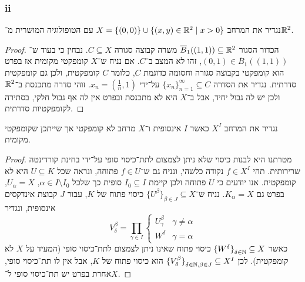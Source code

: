 \subsubsection{ii}
נגדיר את המרחב $X = \{ (0, 0) \} \cup \{ (x, y) \in \mathbb{R}^2 \mid x > 0 \}$ עם הטופולוגיה המושרית מ־$\mathbb{R}^2$.
\begin{proof}
	הכדור הסגור $\overline{B}_1((1, 1)) \subseteq \mathbb{R}^2$ משרה קבוצה סגורה $C \subseteq X$.
	נבחין כי בעוד ש־$(0, 1) \in \overline{B}_1((1, 1))$, זהו לא המצב ב־$C$.
	אם נניח ש־$X$ קומפקטי מקומית אז בפרט הוא קומפקטי בקבוצה סגורה וחסומה כדוגמת $C$, כלומר $C$ קומפקטית, ולכן גם קומפקטית סדרתית.
	נגדיר את הסדרה ${\{ x_n \}}_{n = 1}^\infty \subseteq C$ על־ידי $x_n = (\frac{1}{n}, 1)$.
	זוהי סדרה מתכנסת ב־$\mathbb{R}^2$ ולכן יש לה גבול יחיד, אבל ב־$X$ היא לא מתכנסת ובפרט אין לה אף גבול חלקי, בסתירה לקומפקטיות סדרתית.
\end{proof}

\subquestion{}
נגדיר את המרחב $X^I$ כאשר $I$ אינסופית ו־$X$ מרחב לא קומפקטי אך שייתכן שקומפקטי מקומית.
\begin{proof}
	מטרתנו היא לבנות כיסוי שלא ניתן לצמצום לתת־כיסוי סופי על־ידי בחינת קורדינטה שרירותית.
	תהי $f \in X^I$ נקודה כלשהי, ונניח גם ש־$f \in U$ פתוחה, ונראה שכל $U \subseteq K$ היא לא קומפקטית.
	אנו יודעים כי $U$ פתוחה ולכן קיימת $I_0 \subseteq I$ סופית כך שלכל $\alpha \in I \setminus I_0$, $U_{\alpha} = X$, בפרט גם $K_{\alpha} = X$.
	נניח ש־${\{ U^{\beta} \}}_{\beta \in J} \subseteq X$ כיסוי פתוח של $K$, עבור $J$ קבוצת אינדקסים אינסופית,
	ונגדיר
	\[
		V_{\delta}^{\beta} = \prod_{\gamma \in I} \begin{cases}
			U_{\gamma}^\beta & \gamma \ne \alpha \\
			W^{\delta} & \gamma = \alpha
		\end{cases}
	\]
	כאשר ${\{ W^{\delta} \}}_{\delta \in \mathbb{N}} \subseteq X$ כיסוי פתוח שאינו ניתן לצמצום לתת־כיסוי סופי (המעיד על $X$ לא קומפקטית).
	לכן ${\{ V_{\delta}^\beta \}}_{\delta \in \mathbb{N}, \beta \in J} \subseteq X^I$ הוא כיסוי פתוח של $K$, אבל אין לו תת־כיסוי סופי, אחרת בפרט יש תת־כיסוי סופי ל־$X$.
\end{proof}


